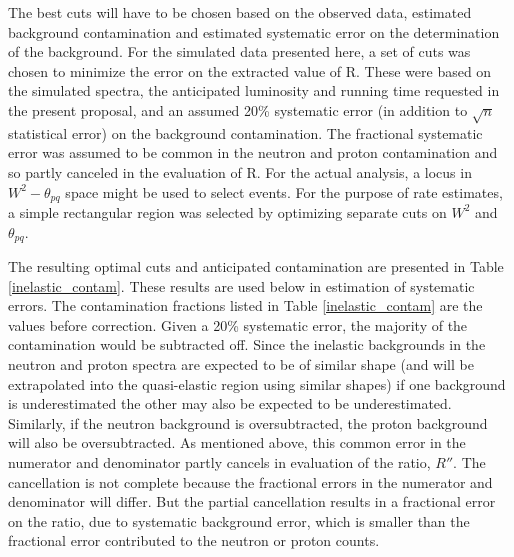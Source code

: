 \documentclass[12pt,letterpaper,oneside]{article}
\begin{document}
The best cuts will have to be chosen based on the observed data,
estimated background contamination and estimated systematic error on
the determination of the background.  For the simulated data presented
here, a set of cuts was chosen to minimize the error on the extracted
value of R.  These were based on the simulated spectra, the
anticipated luminosity and running time requested in the present
proposal, and an assumed 20\% systematic error (in addition to
$\sqrt{n}$ statistical error) on the background contamination.  The
fractional systematic error was assumed to be common in the neutron
and proton contamination and so partly canceled in the evaluation of
R.  For the actual analysis, a locus in $W^2-\theta_{pq}$ space might
be used to select events.  For the purpose of rate estimates, a simple
rectangular region was selected by optimizing separate cuts on $W^2$
and $\theta_{pq}$.

The resulting optimal cuts and anticipated contamination are
presented in Table \ref{inelastic_contam}.  
These results are used
below in estimation of systematic errors.  The contamination
fractions listed in  Table \ref{inelastic_contam} are the values
before correction.  Given a 20\% systematic error, the majority of the
contamination would be subtracted off.  Since the inelastic
backgrounds in the neutron and proton spectra are expected to be of
similar shape (and will be extrapolated into the quasi-elastic region 
using similar shapes) if one background is underestimated the other may
also be expected to be underestimated.  Similarly, if the neutron
background is oversubtracted, the proton background will also be
oversubtracted.   As mentioned above, this common error in the
numerator and denominator partly cancels in evaluation of the ratio,
$R''$.  The cancellation is not complete because the fractional errors
in the numerator and denominator will differ. But the partial
cancellation results in a fractional error on the ratio, due to
systematic background error, which is
smaller than the fractional error contributed to the neutron or proton counts.
\end{document}
